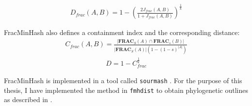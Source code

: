 \begin{align}
  D_{frac}(A, B) = 1 - (\frac{2J_{frac}(A,B)}{1+J_{frac}(A, B)})^{\frac{1}{k}}
\end{align}

FracMinHash also defines a containment index and the corresponding distance:
\begin{align}
  C_{frac}(A, B) = \frac{|\mathbf{FRAC}_S(A) \cap \mathbf{FRAC}_s(B)|}{|\mathbf{FRAC}_S(A)| (1-(1-s)^{|A|})}
\end{align}
\begin{align}
  D=1-C_{frac}^{\frac{1}{k}}
\end{align}

FracMinHash is implemented in a tool called \texttt{sourmash}
\cite{irberLightweightCompositionalAnalysis2022,irberDecentralizingIndicesGenomic2020}.
For the purpose of this thesis, I have implemented the method in
\texttt{fmhdist} to obtain phylogenetic outlines as described in
\cite{bagciMicrobialPhylogeneticContext2021}.
